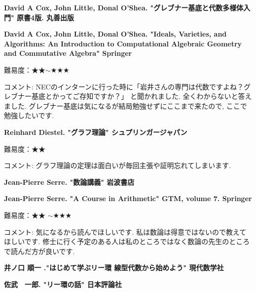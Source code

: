 \vspace{8pt}




\textbf{David A Cox, John Little, Donal O'Shea. "グレブナー基底と代数多様体入門" 原書4版. 丸善出版}  　\vspace{-6pt} 

\textbf{David A Cox, John Little, Donal O'Shea. "Ideals, Varieties, and Algorithms: An Introduction to Computational Algebraic Geometry and Commutative Algebra" Springer}  　\vspace{-6pt} 

難易度：★★$\sim$★★★\vspace{-6pt} 

コメント: NECのインターンに行った時に「岩井さんの専門は代数ですよね？グレブナー基底とかってご存知ですか？」
と聞かれました. 全くわからないと答えました. 
グレブナー基底は気になるが結局勉強せずにここまで来たので, ここで勉強したいです. 
\vspace{8pt}

\textbf{Reinhard Diestel. "グラフ理論" シュプリンガージャパン}  　\vspace{-6pt} 

難易度：★★\vspace{-6pt} 

コメント: グラフ理論の定理は面白いが毎回主張や証明忘れてしまいます. 
\vspace{8pt}

\textbf{Jean-Pierre Serre. "数論講義" 岩波書店}  　\vspace{-6pt} 

\textbf{Jean-Pierre Serre. "A Course in Arithmetic" GTM, volume 7. Springer}  　\vspace{-6pt} 

難易度：★★ $\sim$★★★\vspace{-6pt} 

コメント: 気になるから読んでほしいです. 私は数論は得意ではないので教えてほしいです. 
修士に行く予定のある人は私のところではなく数論の先生のところで読んだ方が良いです. 
\vspace{8pt}

\textbf{井ノ口 順一 ."はじめて学ぶリー環 線型代数から始めよう" 現代数学社} \vspace{-6pt} 

\textbf{佐武　一郎. "リー環の話" 日本評論社} \vspace{-6pt} 


